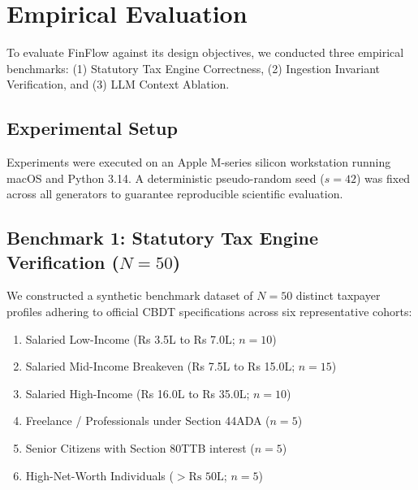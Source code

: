 \documentclass[conference]{IEEEtran}
\begin{document}
\section{Empirical Evaluation}
To evaluate FinFlow against its design objectives, we conducted three empirical benchmarks: (1) Statutory Tax Engine Correctness, (2) Ingestion Invariant Verification, and (3) LLM Context Ablation.

\subsection{Experimental Setup}
Experiments were executed on an Apple M-series silicon workstation running macOS and Python 3.14. A deterministic pseudo-random seed ($s = 42$) was fixed across all generators to guarantee reproducible scientific evaluation.

\subsection{Benchmark 1: Statutory Tax Engine Verification ($N=50$)}
We constructed a synthetic benchmark dataset of $N = 50$ distinct taxpayer profiles adhering to official CBDT specifications across six representative cohorts:
\begin{enumerate}
    \item Salaried Low-Income (Rs 3.5L to Rs 7.0L; $n=10$)
    \item Salaried Mid-Income Breakeven (Rs 7.5L to Rs 15.0L; $n=15$)
    \item Salaried High-Income (Rs 16.0L to Rs 35.0L; $n=10$)
    \item Freelance / Professionals under Section 44ADA ($n=5$)
    \item Senior Citizens with Section 80TTB interest ($n=5$)
    \item High-Net-Worth Individuals ($> \text{Rs } 50\text{L}$; $n=5$)
\end{enumerate}
\end{document}
